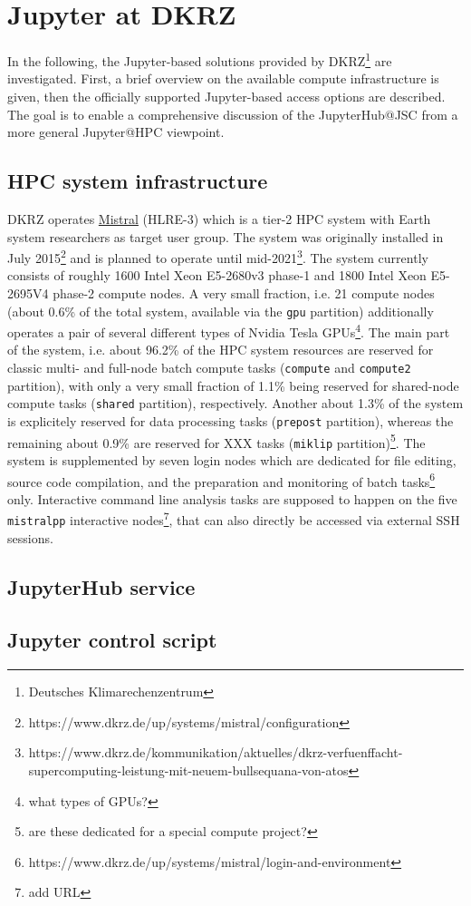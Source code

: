 \section{Jupyter at DKRZ}
\label{sect:jupyter-at-dkrz}

In the following, the Jupyter-based solutions provided by DKRZ\footnote{Deutsches Klimarechenzentrum} are investigated.
First, a brief overview on the available compute infrastructure is given, then the officially supported Jupyter-based access options are described.
The goal is to enable a comprehensive discussion of the JupyterHub@JSC from a more general Jupyter@HPC viewpoint.

\subsection{HPC system infrastructure}

DKRZ operates \href{https://www.dkrz.de/up/systems/mistral}{Mistral} (HLRE-3) which is a tier-2 HPC system \cite{Wissenschaftsrat2015, GaussAllianz2020} with Earth system researchers as target user group.
The system was originally installed in July 2015\footnote{https://www.dkrz.de/up/systems/mistral/configuration} and is planned to operate until mid-2021\footnote{https://www.dkrz.de/kommunikation/aktuelles/dkrz-verfuenffacht-supercomputing-leistung-mit-neuem-bullsequana-von-atos}.
The system currently consists of roughly 1600 Intel Xeon E5-2680v3 phase-1 and 1800 Intel Xeon E5-2695V4 phase-2 compute nodes.
A very small fraction, i.e. 21 compute nodes (about 0.6\% of the total system, available via the \verb|gpu| partition) additionally operates a pair of several different types of Nvidia Tesla GPUs\footnote{what types of GPUs?}.
The main part of the system, i.e. about 96.2\% of the HPC system resources are reserved for classic multi- and full-node batch compute tasks (\verb|compute| and \verb|compute2| partition), with only a very small fraction of 1.1\% being reserved for shared-node compute tasks (\verb|shared| partition), respectively.
Another about 1.3\% of the system is explicitely reserved for data processing tasks (\verb|prepost| partition), whereas the remaining about 0.9\% are reserved for XXX tasks (\verb|miklip| partition)\footnote{are these dedicated for a special compute project?}.
The system is supplemented by seven login nodes which are dedicated for file editing, source code compilation, and the preparation and monitoring of batch tasks\footnote{https://www.dkrz.de/up/systems/mistral/login-and-environment} only.
Interactive command line analysis tasks are supposed to happen on the five \verb|mistralpp| interactive nodes\footnote{add URL}, that can also directly be accessed via external SSH sessions.

\subsection{JupyterHub service}

\subsection{Jupyter control script}
